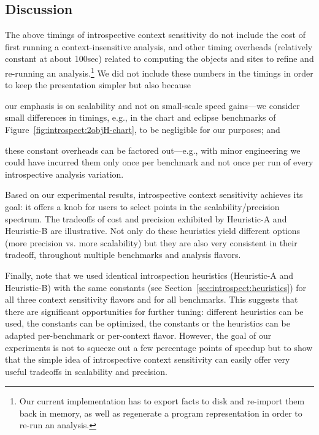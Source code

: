 \subsection{Discussion}
The above timings of introspective context sensitivity do not include the cost of first running a context-insensitive analysis, and other timing overheads (relatively constant at about 100sec) related to computing the objects and sites to refine and re-running an analysis.\footnote{Our current implementation has to export facts to disk and re-import them back in memory, as well as regenerate a program representation in order to re-run an analysis.} We did not include these numbers in the timings in order to keep the presentation simpler but also because
\begin{inparaenum}[(a)]
\item our emphasis is on scalability and not on small-scale speed gains---we consider small differences in timings, e.g., in the chart and eclipse benchmarks of Figure~\ref{fig:introspect:2objH-chart}, to be negligible for our purposes; and
\item these constant overheads can be factored out---e.g., with minor engineering we could have incurred them only once per benchmark and not once per run of every introspective analysis variation.
\end{inparaenum}

Based on our experimental results, introspective context sensitivity achieves its goal: it offers a knob for users to select points in the scalability/precision spectrum. The tradeoffs of cost and precision exhibited by Heuristic-A and Heuristic-B are illustrative. Not only do these heuristics yield different options (more precision vs. more scalability) but they are also very consistent in their tradeoff, throughout multiple benchmarks and analysis flavors.

Finally, note that we used identical introspection heuristics (Heuristic-A and Heuristic-B) with the same constants (see Section~\ref{sec:introspect:heuristics}) for all three context sensitivity flavors and for all benchmarks. This suggests that there are significant opportunities for further tuning: different heuristics can be used, the constants can be optimized, the constants or the heuristics can be adapted per-benchmark or per-context flavor. However, the goal of our experiments is not to squeeze out a few percentage points of speedup but to show that the simple idea of introspective context sensitivity can easily offer very useful tradeoffs in scalability and precision.


